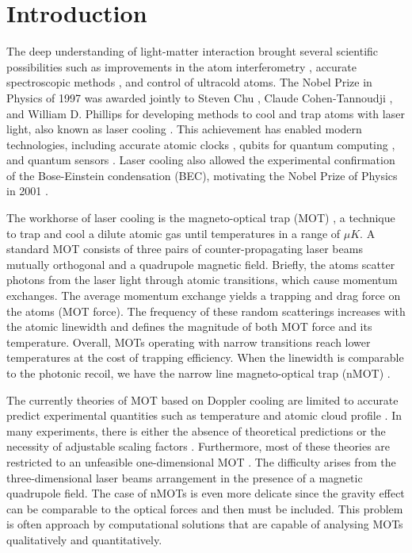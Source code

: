 %
%
\chapter{Introduction}
\label{ch:introduction}

The deep understanding of light-matter interaction brought several scientific possibilities such as improvements in the atom interferometry \cite{peters2001high}, accurate spectroscopic methods \cite{mukamel2020roadmap}, and control of ultracold atoms. 
The Nobel Prize in Physics of 1997 was awarded jointly to Steven Chu \cite{chu1998nobel}, Claude Cohen-Tannoudji \cite{cohen1998nobel}, and William D. Phillips \cite{phillips1998nobel} for developing methods to cool and trap atoms with laser light, also known as laser cooling \cite{metcalf2007laser}. This achievement has enabled modern technologies, including accurate atomic clocks \cite{ludlow2015optical}, qubits for quantum computing \cite{schneider2012quantum}, and quantum sensors \cite{zhang2016precision}. Laser cooling also allowed the experimental confirmation of the Bose-Einstein condensation (BEC), motivating the Nobel Prize of Physics in 2001 \cite{cornell2002nobel, ketterle2002nobel}.

The workhorse of laser cooling is the magneto-optical trap (MOT) \cite{krzysztof2010magneto}, a technique to trap and cool a dilute atomic gas until temperatures in a range of $\mu K$. A standard MOT consists of three pairs of counter-propagating laser beams mutually orthogonal and a quadrupole magnetic field. Briefly, the atoms scatter photons from the laser light through atomic transitions, which cause momentum exchanges. The average momentum exchange yields a trapping and drag force on the atoms (MOT force). The frequency of these random scatterings increases with the atomic linewidth and defines the magnitude of both MOT force and its temperature. Overall, MOTs operating with narrow transitions reach lower temperatures at the cost of trapping efficiency. When the linewidth is comparable to the photonic recoil, we have the narrow line magneto-optical trap (nMOT) \cite{frisch2012narrow, maier2014narrow, miyazawa2021narrow}.

The currently theories of MOT based on Doppler cooling are limited to accurate predict experimental quantities such as temperature \cite{lett1988observation} and atomic cloud profile \cite{gattobigio2010scaling}. In many experiments, there is either the absence of theoretical predictions or the necessity of adjustable scaling factors \cite{loo2003investigations}. Furthermore, most of these theories are restricted to an unfeasible one-dimensional MOT \cite{metcalf2007laser, balykin2000electromagnetic}. The difficulty arises from the three-dimensional laser beams arrangement in the presence of a magnetic quadrupole field. The case of nMOTs is even more delicate since the gravity effect can be comparable to the optical forces and then must be included. This problem is often approach by computational solutions \cite{chaudhuri2006realization, atutov2001sodium,hanley2018quantitative} that are capable of analysing MOTs qualitatively and quantitatively.

